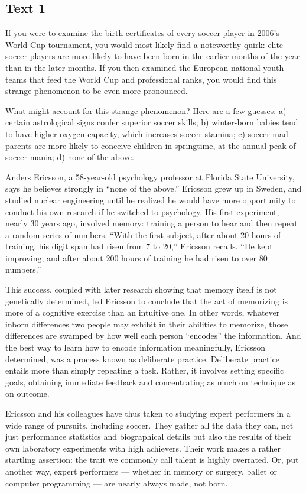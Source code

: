 \documentclass[UTF8,11pt]{ctexart}
\begin{document}
\subsection*{\textbf{Text 1}}


If you were to examine the birth certificates of every soccer player in 2006’s World Cup tournament, you would most likely find a noteworthy quirk: elite soccer players are more likely to have been born in the earlier months of the year than in the later months. If you then examined the European national youth teams that feed the World Cup and professional ranks, you would find this strange phenomenon to be even more pronounced.


What might account for this strange phenomenon? Here are a few guesses: a) certain astrological signs confer superior soccer skills; b) winter-born babies tend to have higher oxygen capacity, which increases soccer stamina; c) soccer-mad parents are more likely to conceive children in springtime, at the annual peak of soccer mania; d) none of the above.


Anders Ericsson, a 58-year-old psychology professor at Florida State University, says he believes strongly in “none of the above.” Ericsson grew up in Sweden, and studied nuclear engineering until he realized he would have more opportunity to conduct his own research if he switched to psychology. His first experiment, nearly 30 years ago, involved memory: training a person to hear and then repeat a random series of numbers. “With the first subject, after about 20 hours of training, his digit span had risen from 7 to 20,” Ericsson recalls. “He kept improving, and after about 200 hours of training he had risen to over 80 numbers.”


This success, coupled with later research showing that memory itself is not genetically determined, led Ericsson to conclude that the act of memorizing is more of a cognitive exercise than an intuitive one. In other words, whatever inborn differences two people may exhibit in their abilities to memorize, those differences are swamped by how well each person “encodes” the information. And the best way to learn how to encode information meaningfully, Ericsson determined, was a process known as deliberate practice. Deliberate practice entails more than simply repeating a task. Rather, it involves setting specific goals, obtaining immediate feedback and concentrating as much on technique as on outcome.


Ericsson and his colleagues have thus taken to studying expert performers in a wide range of pursuits, including soccer. They gather all the data they can, not just performance statistics and biographical details but also the results of their own laboratory experiments with high achievers. Their work makes a rather startling assertion: the trait we commonly call talent is highly overrated. Or, put another way, expert performers — whether in memory or surgery, ballet or computer programming — are nearly always made, not born.
\end{document}
